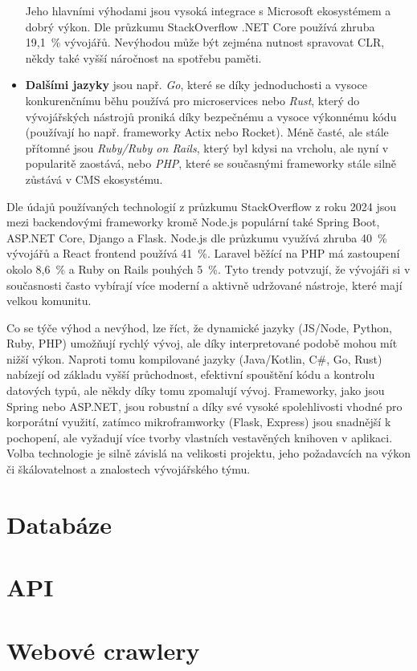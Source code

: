 \begin{itemize}
        Jeho hlavními výhodami jsou vysoká integrace s Microsoft ekosystémem
        a dobrý výkon. Dle průzkumu StackOverflow .NET Core používá
        zhruba 19,1~\% vývojářů. %
        Nevýhodou může být zejména nutnost spravovat CLR, někdy také
        vyšší náročnost na spotřebu paměti.
    \item \textbf{Dalšími jazyky} jsou např. \emph{Go}, které se díky
        jednoduchosti a vysoce konkurenčnímu běhu používá pro microservices
        nebo \emph{Rust}, který do vývojářských nástrojů proniká díky
        bezpečnému a vysoce výkonnému kódu (používají ho např. frameworky
        Actix nebo Rocket). Méně časté, ale stále přítomné jsou
        \emph{Ruby/Ruby on Rails}, který byl kdysi na vrcholu, ale nyní
        v popularitě zaostává, nebo \emph{PHP}, které se současnými
        frameworky stále silně zůstává v CMS ekosystému.
\end{itemize}

Dle údajů používaných technologií z průzkumu StackOverflow z roku 2024
jsou mezi backendovými frameworky kromě Node.js populární také Spring
Boot, ASP.NET Core, Django a Flask. Node.js dle průzkumu využívá zhruba
40~\% vývojářů a React frontend používá 41~\%. Laravel běžící na PHP
má zastoupení okolo 8,6~\% a Ruby on Rails pouhých 5~\%. Tyto trendy
potvzují, že vývojáři si v současnosti často vybírají více moderní
a aktivně udržované nástroje, které mají velkou komunitu.

Co se týče výhod a nevýhod, lze říct, že dynamické jazyky (JS/Node,
Python, Ruby, PHP) umožňují rychlý vývoj, ale díky interpretované
podobě mohou mít nižší výkon. Naproti tomu kompilované jazyky
(Java/Kotlin, C\#, Go, Rust) nabízejí od základu vyšší průchodnost,
efektivní spouštění kódu a kontrolu datových typů, ale někdy díky
tomu zpomalují vývoj. Frameworky, jako jsou Spring nebo ASP.NET,
jsou robustní a díky své vysoké spolehlivosti vhodné pro korporátní
využití, %
zatímco mikroframworky (Flask, Express) jsou snadnější k pochopení,
ale vyžadují více tvorby vlastních vestavěných knihoven v aplikaci.
Volba technologie je silně závislá na velikosti projektu, jeho
požadavcích na výkon či škálovatelnost a znalostech vývojářského
týmu.

\section{Databáze}


\section{API}


\section{Webové crawlery}


\endinput
